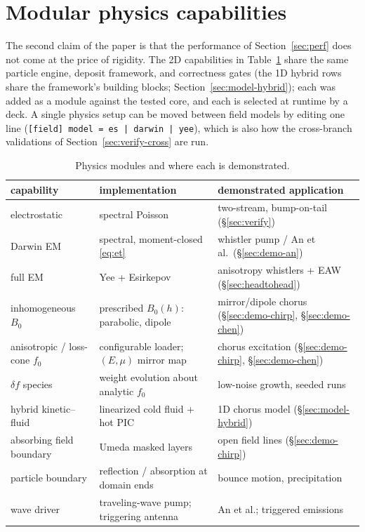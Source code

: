 \documentclass[11pt]{article}
\begin{document}
\section{Modular physics capabilities}
\label{sec:modules}

The second claim of the paper is that the performance of
Section~\ref{sec:perf} does not come at the price of rigidity. The 2D
capabilities in Table~\ref{tab:modules} share the same particle engine,
deposit framework, and correctness gates (the 1D hybrid rows share the
framework's building blocks; Section~\ref{sec:model-hybrid}); each was
added as a module against the tested core, and each is selected at
runtime by a deck.
A single physics setup can be moved between field models by editing one
line (\texttt{[field] model = es | darwin | yee}), which is also how
the cross-branch validations of Section~\ref{sec:verify-cross} are run.

\begin{table}[htbp]
\centering
\caption{Physics modules and where each is demonstrated.}
\label{tab:modules}
\small
\begin{tabular}{lll}
\toprule
capability & implementation & demonstrated application\\
\midrule
electrostatic & spectral Poisson & two-stream, bump-on-tail (\S\ref{sec:verify})\\
Darwin EM & spectral, moment-closed \eqref{eq:et} & whistler pump / An et al.\ (\S\ref{sec:demo-an})\\
full EM & Yee + Esirkepov & anisotropy whistlers + EAW (\S\ref{sec:headtohead})\\
inhomogeneous $B_0$ & prescribed $B_0(h)$: parabolic, dipole & mirror/dipole chorus (\S\ref{sec:demo-chirp}, \S\ref{sec:demo-chen})\\
anisotropic / loss-cone $f_0$ & configurable loader; $(E,\mu)$ mirror map & chorus excitation (\S\ref{sec:demo-chirp}, \S\ref{sec:demo-chen})\\
$\delta f$ species & weight evolution about analytic $f_0$ & low-noise growth, seeded runs\\
hybrid kinetic--fluid & linearized cold fluid + hot PIC & 1D chorus model (\S\ref{sec:model-hybrid})\\
absorbing field boundary & Umeda masked layers \cite{umeda2001} & open field lines (\S\ref{sec:demo-chirp})\\
particle boundary & reflection / absorption at domain ends & bounce motion, precipitation\\
wave driver & traveling-wave pump; triggering antenna & An et al.; triggered emissions\\
\bottomrule
\end{tabular}
\end{table}
\end{document}

